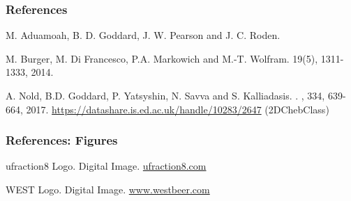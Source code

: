 \documentclass[aspectratio=169,xcolor=dvipsnames]{beamer}
\begin{document}
\begin{frame}
\frametitle{References}    
\begin{thebibliography}{10}    

	M. Aduamoah, B. D. Goddard, J. W. Pearson and J. C. Roden.
	
	M. Burger, M. Di Francesco, P.A. Markowich and  M.-T. Wolfram. 
	 19(5), 1311-1333, 2014. 	
	
	A. Nold, B.D. Goddard, P. Yatsyshin, N. Savva and S. Kalliadasis. 
	.
	, 334, 639-664, 2017.
	\newblock \url{https://datashare.is.ed.ac.uk/handle/10283/2647} (2DChebClass)
\end{thebibliography}
\end{frame}
\begin{frame}
	\frametitle{References: Figures}   
	\begin{thebibliography}{10}    
		ufraction8 Logo. Digital Image. 
		\url{ufraction8.com}
		
		WEST Logo. Digital Image.  \url{www.westbeer.com}
	\end{thebibliography}	
\end{frame}
\end{document}

